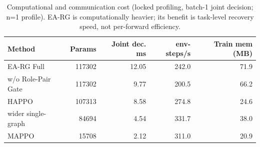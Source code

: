 \begin{table}[t]
\centering
\small
\caption{Computational and communication cost (locked profiling, batch-1 joint decision; n=1 profile). EA-RG is computationally heavier; its benefit is task-level recovery speed, not per-forward efficiency.}
\label{tab:efficiency}
\begin{tabular}{lrrrr}
\toprule
Method & Params & Joint dec. ms & env-steps/s & Train mem (MB) \\
\midrule
EA-RG Full & 117302 & 12.05 & 242.0 & 71.9 \\
w/o Role-Pair Gate & 117302 & 9.77 & 200.5 & 66.2 \\
HAPPO & 107313 & 8.58 & 274.8 & 24.6 \\
wider single-graph & 84694 & 4.54 & 331.7 & 38.0 \\
MAPPO & 15708 & 2.12 & 311.0 & 20.9 \\
\bottomrule
\end{tabular}
\end{table}